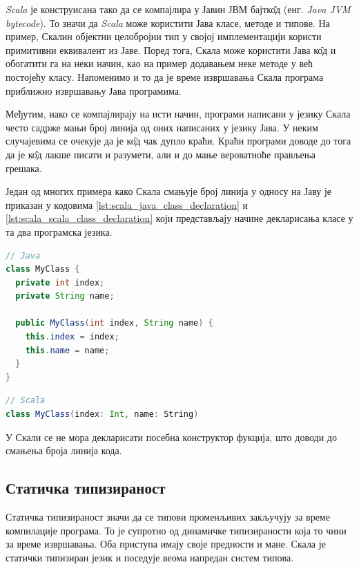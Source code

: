 \documentclass[12pt,oneside]{memoir}
\begin{document}
\textit{Scala} је конструисана тако да се компајлира у Јавин ЈВМ бајтк\^{о}д (енг. \textit{Java JVM bytecode}). То значи да \textit{Scala} може користити Јава класе, методе и типове. На пример, Скалин објектни целобројни тип у својој имплементацији користи примитивни еквивалент из Јаве. Поред тога, Скала може користити Јава к\^{о}д и обогатити га на неки начин, као на пример додавањем неке методе у већ постојећу класу. Напоменимо и то да је време извршавања Скала програма приближно извршавању Јава програмима. \cite{scala_prog}

Међутим, иако се компајлирају на исти начин, програми написани у језику Скала често садрже мањи број линија од оних написаних у језику Јава. У неким случајевима се очекује да је к\^{о}д чак дупло краћи. Краћи програми доводе до тога да је к\^{о}д лакше писати и разумети, али и до мање вероватноће прављења грешака. \cite{scala_prog}

Један од многих примера како Скала смањује број линија у односу на Јаву је приказан у кодовима \ref{lst:scala_java_class_declaration} и \ref{lst:scala_scala_class_declaration} који представљају начине декларисања класе у та два програмска језика.

\begin{lstlisting}[caption={Декларација класе у језику Јава}, language=Java, label={lst:scala_java_class_declaration}]
// Java
class MyClass {  
  private int index;
  private String name;
  
  public MyClass(int index, String name) {
    this.index = index;
    this.name = name;
  }
}
\end{lstlisting}

\begin{lstlisting}[caption={Декларација класе у језику Scala}, language=Scala, label={lst:scala_scala_class_declaration}]
// Scala
class MyClass(index: Int, name: String)

\end{lstlisting}

У Скали се не мора декларисати посебна конструктор фукција, што доводи до смањења броја линија кода. \cite{scala_prog}

\subsection{Статичка типизираност}
\label{subsec:scala_stat_tip}

Статичка типизираност значи да се типови променљивих закључују за време компилације програма. То је супротно од динамичке типизираности која то чини за време извршавања. Оба приступа имају своје предности и мане. Скала је статички типизиран језик и поседује веома напредан систем типова.
\end{document}
